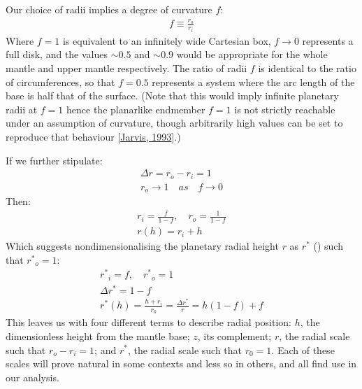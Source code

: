 \documentclass[letterpaper,10pt,english]{jupyterBook}
\begin{document}
\sphinxAtStartPar
Our choice of radii implies a degree of curvature \(f\):
\begin{equation*}
\begin{split} f \equiv \frac{r_o}{r_i} \end{split}
\end{equation*}
\sphinxAtStartPar
Where \(f=1\) is equivalent to an infinitely wide Cartesian box, \(f\to0\) represents a full disk, and the values \(\sim 0.5\) and \(\sim 0.9\) would be appropriate for the whole mantle and upper mantle respectively. The ratio of radii \(f\) is identical to the ratio of circumferences, so that \(f=0.5\) represents a system where the arc length of the base is half that of the surface. (Note that this would imply infinite planetary radii at \(f=1\) \sphinxhyphen{} hence the planar\sphinxhyphen{}like endmember \(f=1\) is not strictly reachable under an assumption of curvature, though arbitrarily high values can be set to reproduce that behaviour {[}\hyperlink{cite.references:id442}{Jarvis, 1993}{]}.)

\sphinxAtStartPar
If we further stipulate:
\begin{equation*}
\begin{split}
\Delta r = r_{o} - r_{i} = 1 \\
r_{o} \to 1 \quad as \quad f \to 0
\end{split}
\end{equation*}
\sphinxAtStartPar
Then:
\begin{equation*}
\begin{split}
r_i = \frac{f}{1 - f}, \quad r_o = \frac{1}{1 - f} \\
r(h) = r_i + h
\end{split}
\end{equation*}
\sphinxAtStartPar
Which suggests non\sphinxhyphen{}dimensionalising the planetary radial height \(r\) as \(r^{*}\) () such that \({r^{*}}_o = 1\):
\begin{equation*}
\begin{split}
{r^{*}}_i = f, \quad {r^{*}}_o = 1 \\
\Delta r^{*} = 1 - f \\
r^{*}(h) = \frac{h + r_i}{r_0} = \frac{\Delta r^{*}}{r} = h(1-f) + f
\end{split}
\end{equation*}
\sphinxAtStartPar
This leaves us with four different terms to describe radial position: \(h\), the dimensionless height from the mantle base; \(z\), its complement; \(r\), the radial scale such that \(r_o - r_i = 1\); and \(r^{*}\), the radial scale such that \(r_0 = 1\). Each of these scales will prove natural in some contexts and less so in others, and all find use in our analysis.
\end{document}
